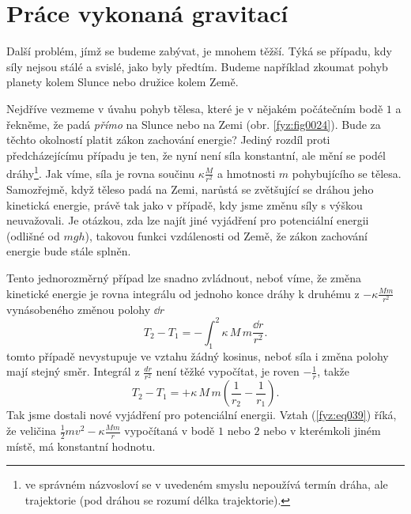   \section{Práce vykonaná gravitací}
    Další problém, jímž se budeme zabývat, je mnohem těžší. Týká se případu, kdy síly nejsou stálé 
    a svislé, jako byly předtím. Budeme například zkoumat pohyb planety kolem Slunce nebo družice 
    kolem Země.
    
    Nejdříve vezmeme v úvahu pohyb tělesa, které je v nějakém počátečním bodě \(1\) a řekněme, že 
    padá \emph{přímo} na Slunce nebo na Zemi (obr. \ref{fyz:fig0024}). Bude za těchto okolností 
    platit zákon zachování energie? Jediný rozdíl proti předcházejícímu případu je ten, že nyní 
    není síla konstantní, ale mění se podél dráhy\footnote{ve správném názvosloví se v uvedeném 
    smyslu nepoužívá termín dráha, ale trajektorie (pod dráhou se rozumí délka trajektorie).}. Jak 
    víme, síla je rovna součinu \(\kappa\frac{M}{r^2}\) a hmotnosti \(m\) pohybujícího se tělesa. 
    Samozřejmě, když těleso padá na Zemi, narůstá se zvětšující se dráhou jeho kinetická energie, 
    právě tak jako v případě, kdy jsme změnu síly s výškou neuvažovali. Je otázkou, zda lze najít 
    jiné vyjádření pro potenciální energii (odlišné od \(mgh\)), takovou funkci vzdálenosti od 
    Země, že zákon zachování energie bude stále splněn.
    

    Tento jednorozměrný případ lze snadno zvládnout, neboť víme, že změna kinetické energie je 
    rovna integrálu od jednoho konce dráhy k druhému z  \(-\kappa\frac{Mm}{r^2}\) vynásobeného 
    změnou polohy \(\dd{r}\)
    \begin{equation}\label{fyz:eq038}
      T_2 - T_1 = -\int_{1}^{2}\kappa\,M\,m\frac{\dd{r}}{r^2}.
    \end{equation}
    tomto případě nevystupuje ve vztahu žádný kosinus, neboť síla i změna polohy mají stejný směr. 
    Integrál z \(\frac{dr}{r^2}\) není těžké vypočítat, je roven \(-\frac{1}{r}\), takže
    \begin{equation}\label{fyz:eq039}
      T_2 - T_1 = +\kappa\,M\,m\left(\dfrac{1}{r_2} - \dfrac{1}{r_1}\right).
    \end{equation}
    Tak jsme dostali nové vyjádření pro potenciální energii. Vztah (\ref{fyz:eq039}) říká, že 
    veličina \(\frac{1}{2}mv^2 - \kappa\frac{Mm}{r}\) vypočítaná v bodě \(1\) nebo \(2\) nebo v 
    kterémkoli jiném místě, má konstantní hodnotu.
    
